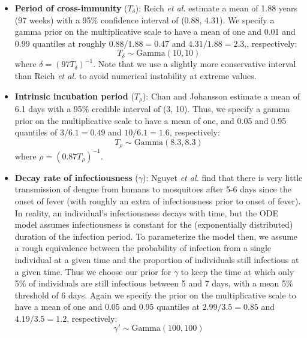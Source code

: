 \documentclass[12pt,letterpaper]{article}
\begin{document}
\begin{itemize}
\item \textbf{Period of cross-immunity} ($T_{\delta}$): Reich \emph{et al.} \cite{Reich2013} estimate a mean of 1.88 years (97 weeks) with a 95\% confidence interval of (0.88, 4.31).
We specify a gamma prior on the multiplicative scale to have a mean of one and 0.01 and 0.99 quantiles at roughly $0.88/1.88 = 0.47$ and $4.31/1.88 = 2.3$,, respectively:
\begin{equation}
T_{\delta} \sim \text{Gamma}(10, 10)
\end{equation}
where $\delta = (97 T_\delta)^{-1}$.
Note that we use a slightly more conservative interval than Reich \emph{et al.} to avoid numerical instability at extreme values.
\\
\item \textbf{Intrinsic incubation period} ($T_{\rho}$): Chan and Johansson \cite{Chan2012} estimate a mean of 6.1 days with a 95\% credible interval of (3, 10).
Thus, we specify a gamma prior on the multiplicative scale to have a mean of one, and 0.05 and 0.95 quantiles of $3 / 6.1 = 0.49$ and $10 / 6.1 = 1.6$, respectively:
\begin{equation}
T_{\rho} \sim \text{Gamma}(8.3, 8.3)
\end{equation}
where $\rho = (0.87 T_{\rho})^{-1}$.
\\
\item \textbf{Decay rate of infectiousness} ($\gamma$): Nguyet \emph{et al.} \cite{Nguyet2013} find that there is very little transmission of dengue from humans to mosquitoes after 5-6 days since the onset of fever (with roughly an extra of infectiousness prior to onset of fever).
In reality, an individual's infectiousness decays with time, but the ODE model assumes infectiousness is constant for the (exponentially distributed) duration of the infection period.    
To parameterize the model then, we assume a rough equivalence between the probability of infection from a single individual at a given time and the proportion of individuals still infectious at a given time.
Thus we choose our prior for $\gamma$ to keep the time at which only 5\% of individuals are still infectious between 5 and 7 days, with a mean 5\% threshold of 6 days.
Again we specify the prior on the multiplicative scale to have a mean of one and 0.05 and 0.95 quantiles at $2.99/3.5 = 0.85$ and $4.19 / 3.5 = 1.2$, respectively:
\begin{equation}
\gamma' \sim \text{Gamma}(100, 100)
\end{equation}

\end{itemize}
\end{document}

